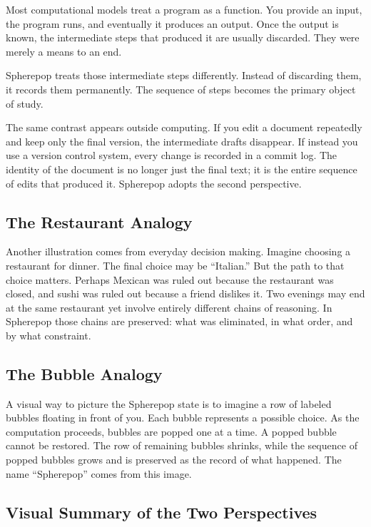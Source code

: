 \documentclass[12pt]{article}
\begin{document}
Most computational models treat a program as a function. You provide an input, the program runs, and eventually it produces an output. Once the output is known, the intermediate steps that produced it are usually discarded. They were merely a means to an end.

Spherepop treats those intermediate steps differently. Instead of discarding them, it records them permanently. The sequence of steps becomes the primary object of study.

The same contrast appears outside computing. If you edit a document repeatedly and keep only the final version, the intermediate drafts disappear. If instead you use a version control system, every change is recorded in a commit log. The identity of the document is no longer just the final text; it is the entire sequence of edits that produced it. Spherepop adopts the second perspective.

\subsection{The Restaurant Analogy}

Another illustration comes from everyday decision making. Imagine choosing a restaurant for dinner. The final choice may be ``Italian.'' But the path to that choice matters. Perhaps Mexican was ruled out because the restaurant was closed, and sushi was ruled out because a friend dislikes it. Two evenings may end at the same restaurant yet involve entirely different chains of reasoning. In Spherepop those chains are preserved: what was eliminated, in what order, and by what constraint.

\subsection{The Bubble Analogy}

A visual way to picture the Spherepop state is to imagine a row of labeled bubbles floating in front of you. Each bubble represents a possible choice. As the computation proceeds, bubbles are popped one at a time. A popped bubble cannot be restored. The row of remaining bubbles shrinks, while the sequence of popped bubbles grows and is preserved as the record of what happened. The name ``Spherepop'' comes from this image.

\subsection{Visual Summary of the Two Perspectives}
\end{document}
